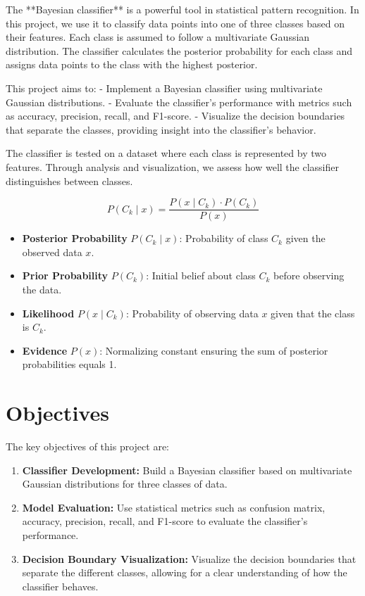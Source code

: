 \documentclass[conference]{IEEEtran}
\begin{document}
	The **Bayesian classifier** is a powerful tool in statistical pattern recognition. In this project, we use it to classify data points into one of three classes based on their features. Each class is assumed to follow a multivariate Gaussian distribution. The classifier calculates the posterior probability for each class and assigns data points to the class with the highest posterior.
	
	This project aims to:
	- Implement a Bayesian classifier using multivariate Gaussian distributions.
	- Evaluate the classifier's performance with metrics such as accuracy, precision, recall, and F1-score.
	- Visualize the decision boundaries that separate the classes, providing insight into the classifier's behavior.
	
	The classifier is tested on a dataset where each class is represented by two features. Through analysis and visualization, we assess how well the classifier distinguishes between classes.
	
	\[
	P(C_k \mid x) = \frac{P(x \mid C_k) \cdot P(C_k)}{P(x)}
	\]
	
	\begin{itemize}
		\item \textbf{Posterior Probability} \( P(C_k \mid x) \): Probability of class \( C_k \) given the observed data \( x \).
		\item \textbf{Prior Probability} \( P(C_k) \): Initial belief about class \( C_k \) before observing the data.
		\item \textbf{Likelihood} \( P(x \mid C_k) \): Probability of observing data \( x \) given that the class is \( C_k \).
		\item \textbf{Evidence} \( P(x) \): Normalizing constant ensuring the sum of posterior probabilities equals 1.
	\end{itemize}
	
	\section{Objectives}
	
	The key objectives of this project are:
	
	\begin{enumerate}
		\item \textbf{Classifier Development:} Build a Bayesian classifier based on multivariate Gaussian distributions for three classes of data.
		\item \textbf{Model Evaluation:} Use statistical metrics such as confusion matrix, accuracy, precision, recall, and F1-score to evaluate the classifier’s performance.
		\item \textbf{Decision Boundary Visualization:} Visualize the decision boundaries that separate the different classes, allowing for a clear understanding of how the classifier behaves.
	\end{enumerate}
	
\end{document}
